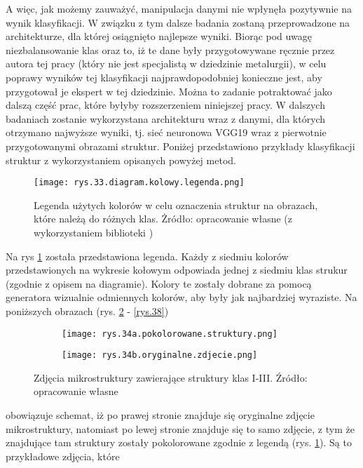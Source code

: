 A więc, jak możemy zauważyć, manipulacja danymi nie wpłynęła pozytywnie na wynik klasyfikacji. W związku z tym dalsze badania zostaną przeprowadzone na architekturze, dla której osiągnięto najlepsze wyniki. Biorąc pod uwagę niezbalansowanie klas oraz to, iż te dane były przygotowywane ręcznie przez autora tej pracy (który nie jest specjalistą w dziedzinie metalurgii), w celu poprawy wyników tej klasyfikacji najprawdopodobniej konieczne jest, aby przygotował je ekspert w tej dziedzinie. Można to zadanie potraktować jako dalszą część prac, które byłyby rozszerzeniem niniejszej pracy. W dalszych badaniach zostanie wykorzystana architekturu wraz z danymi, dla których otrzymano najwyższe wyniki, tj. sieć neuronowa VGG19 wraz z pierwotnie przygotowanymi obrazami struktur.
Poniżej przedstawiono przykłady klasyfikacji struktur z wykorzystaniem opisanych powyżej metod.
\begin{figure}[h]
    \centering
    \texttt{[image: rys.33.diagram.kolowy.legenda.png]}
    \caption{Legenda użytych kolorów w celu oznaczenia struktur na obrazach, które należą do różnych klas. Żródło: opracowanie własne (z wykorzystaniem biblioteki )}
    \label{rys.33.diagram.kolowy.legenda.png}
\end{figure}
Na rys \ref{rys.33.diagram.kolowy.legenda.png} została przedstawiona legenda. Każdy z siedmiu kolorów przedstawionych na wykresie kołowym odpowiada jednej z siedmiu klas strukur (zgodnie z opisem na diagramie). Kolory te zostały dobrane za pomocą generatora wizualnie odmiennych kolorów, aby były jak najbardziej wyraziste. Na poniższych obrazach (rys. \ref{rys.34} - \ref{rys.38}) 
\begin{figure}[h]
	\centering
	\begin{subfigure}{0.42\textwidth}
	    \centering
	    \texttt{[image: rys.34a.pokolorowane.struktury.png]}
	\end{subfigure}
	\begin{subfigure}{0.42\textwidth}
	    \centering
	    \texttt{[image: rys.34b.oryginalne.zdjecie.png]}
	\end{subfigure}
	\caption{\label{rys.34}Zdjęcia mikrostruktury zawierające struktury klas I-III. Źródło: opracowanie własne}
\end{figure}
obowiązuje schemat, iż po prawej stronie znajduje się oryginalne zdjęcie mikrostruktury, natomiast po lewej stronie znajduje się to samo zdjęcie, z tym że znajdujące tam struktury zostały pokolorowane zgodnie z legendą (rys. \ref{rys.33.diagram.kolowy.legenda.png}). Są to przykładowe zdjęcia, które 
